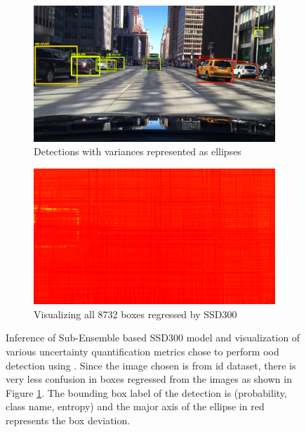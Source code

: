     \begin{figure}[H] \ContinuedFloat
    	\begin{subfigure}[t]{0.495\textwidth}
    		\centering
    		\includegraphics[width=\textwidth]{images/det_images/subensemble_entropies_1.png}
    		\caption{Detections with variances represented as ellipses}
    	\end{subfigure}
    	\begin{subfigure}[t]{0.495\textwidth}
    		\centering
    		\includegraphics[width=\textwidth]{images/det_images/all_subens_bdd_1.png}
    		\caption{Visualizing all 8732 boxes regressed by SSD300}
    		\label{id_subens_8732_boxes}
    	\end{subfigure}
    	
    	\caption[Sub-Ensemble models inference on image from \acrshort{bdd} dataset]{Inference of Sub-Ensemble based SSD300 model and visualization of various uncertainty quantification metrics chose to perform \acrshort{ood} detection using . Since the image chosen is from \acrshort{id} dataset, there is very less confusion in boxes regressed from the images as shown in Figure \ref{id_subens_8732_boxes}. The bounding box label of the detection is (probability, class name, entropy) and the major axis of the ellipse in red represents the box deviation.}
    	\label{sens_inference_id}
    \end{figure}
    
